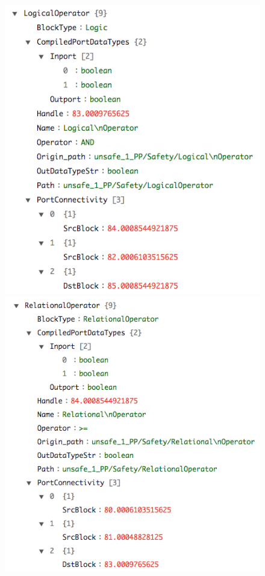 \documentclass{article}
\begin{document}
\begin{figure}[h]
\begin{center}
    \includegraphics[scale=0.35]{figures/safety3}
    \includegraphics[scale=0.35]{figures/safety5}      

\end{center}
\end{figure}
\end{document}
